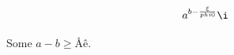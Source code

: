\documentclass{book}
\renewcommand{\_}{\Texinfounderscore\discretionary{}{}{}}
\begin{document}
\[
a^{b - \frac{\xi}{phi \copyright{}}} ı
\]

Some $a - b \geq{} Å ê$.
\end{document}
